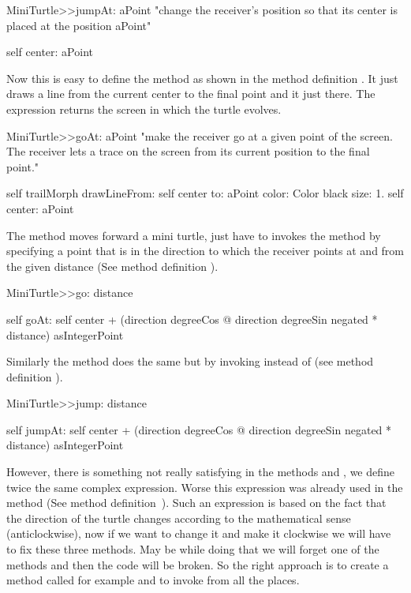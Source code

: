\begin{method}
MiniTurtle>>jumpAt: aPoint
   "change the receiver's position so that its center is placed 
   at the position aPoint"

   self center: aPoint
\end{method}

Now this is easy to define the method  as shown in the
method definition . It just draws a line from the
current center to the final point and it just there.  The expression
 returns the screen in which the turtle evolves.


\begin{method}\label{mth:goAt}
MiniTurtle>>goAt: aPoint
   "make the receiver go at a given point of the screen. The receiver
   lets a trace on the screen from its current position to the final
   point."

   self trailMorph
      drawLineFrom: self center to: aPoint color: Color black size: 1.
   self center: aPoint
\end{method}


The method  moves forward a mini turtle, just
have to invokes the method  by specifying a point
that is in the direction to which the receiver points at and from the
given distance (See method definition ). 

\begin{method}\label{mth:gofirst}
MiniTurtle>>go: distance

   self goAt: self center 
                + (direction degreeCos @ direction degreeSin negated 
                     * distance) asIntegerPoint 
\end{method}

Similarly the method  does the same but by invoking
 instead of  (see method definition
).

\begin{method}\label{mth:jumpfirst}
MiniTurtle>>jump: distance

  self jumpAt: self center 
                + (direction degreeCos @ direction degreeSin negated 
                     * distance) asIntegerPoint 
\end{method}

However, there is something not really satisfying in the methods
 and , we define twice the
same complex expression. Worse this expression was already used in the
method  (See method
definition~). Such an expression is based on
the fact that the direction of the turtle changes according to the
mathematical sense (anticlockwise), now if we want to change it and
make it clockwise we will have to fix these three methods. May be
while doing that we will forget one of the methods and then the code
will be broken. So the right approach is to create a method called for
example  and to invoke from all
the places. 


